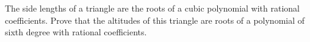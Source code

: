 The side lengths of a triangle are the roots of a cubic polynomial with rational coefficients. Prove that the altitudes of this triangle are roots of a polynomial of sixth degree with rational coefficients.